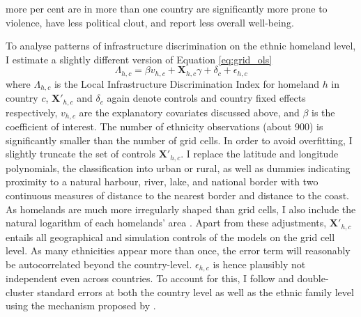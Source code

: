 \documentclass[11pt, oneside]{article}   	%
\begin{document}
more per cent are in more than one country are significantly more prone to violence, have less political clout, and report less overall well-being.

To analyse patterns of infrastructure discrimination on the ethnic homeland level, I estimate a slightly different version of Equation \eqref{eq:grid_ols}
\begin{equation}
  \Lambda_{h,c} = \beta v_{h,c} + \textbf{X}_{h,c}\gamma + \delta_{c} + \epsilon_{h,c}
  \label{eq:ethn_ols}
\end{equation}
where $\Lambda_{h,c}$ is the Local Infrastructure Discrimination Index for homeland $h$ in country $c$, $\textbf{X}'_{h,c}$ and $\delta_{c}$ again denote controls and country fixed effects respectively, $v_{h,c}$ are the explanatory covariates discussed above, and $\beta$ is the coefficient of interest. The number of ethnicity observations (about 900) is significantly smaller than the number of grid cells. In order to avoid overfitting, I slightly truncate the set of controls $\textbf{X}'_{h,c}$. I replace the latitude and longitude polynomials, the classification into urban or rural, as well as dummies indicating proximity to a natural harbour, river, lake, and national border with two continuous measures of distance to the nearest border and distance to the coast. As homelands are much more irregularly shaped than grid cells, I also include the natural logarithm of each homelands' area \citep[as in][]{Michalopoulos_LongRunEffectsScramble_2016}. Apart from these adjustments, $\textbf{X}'_{h,c}$ entails all geographical and simulation controls of the models on the grid cell level. As many ethnicities appear more than once, the error term will reasonably be autocorrelated beyond the country-level. $\epsilon_{h,c}$ is hence plausibly not independent even across countries. To account for this, I follow \cite{Michalopoulos_LongRunEffectsScramble_2016} and double-cluster standard errors at both the country level as well as the ethnic family level using the mechanism proposed by \cite{Cameron_RobustInferenceMultiway_2011}.
\end{document}
